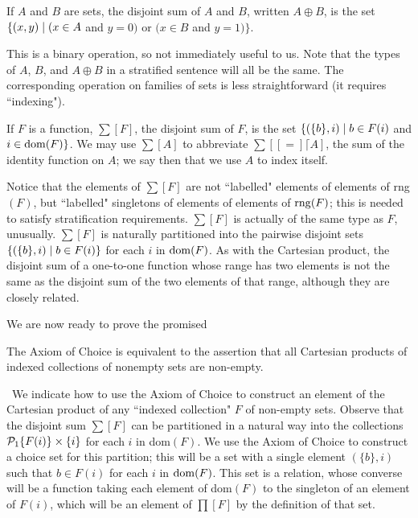 \begin{definition}
 If $A$ and $B$ are sets, the {\upshape disjoint sum} of $A$ and $B$, written $A \oplus B$, is the set $\{(x,y)
 \mid (x \in A$ and $y = 0)$ or $(x \in B$ and $y = 1)\}$.
\end{definition}

This is a binary operation, so not immediately useful to us.
Note that the types of $A$, $B$, and $A \oplus B$ in a
stratified sentence will all be the same.  The
corresponding operation on families of sets is less straightforward (it
requires ``indexing").

\begin{definition}
 If $F$ is a function, $\sum[F]$, the {\upshape disjoint
 sum\/} of $F$, is the 
 set $\{(\{b\},i) \mid b \in F(i)$ and $i \in \mathop{\mathrm{dom}}(F)\}$.  We may use
 $\sum[ A]$ to abbreviate $\sum[ [=] \lceil A]$, the sum of the
 identity function on $A$; we say then that we use $A$ to index itself.
\end{definition}

Notice that the elements of $\sum[ F]$ are not ``labelled" elements
of elements of rng$(F)$, but ``labelled" singletons of
elements of elements of $\mathop{\mathrm{rng}}(F)$; this is needed to satisfy
stratification requirements.  $\sum[ F]$ is actually of
the same type as $F$, unusually.
$\sum[ F]$ is naturally partitioned into the pairwise
disjoint sets $\{(\{b\},i)
\mid b \in F(i)\}$ for each $i$ in $\mathop{\mathrm{dom}}(F)$.  As with the
Cartesian product, the
disjoint sum of a one-to-one
function whose range has two elements is not the same as the
disjoint sum of the two elements of that range,
although they are closely related.

We are now ready to prove the promised

\begin{thm}
 The Axiom of Choice is equivalent to the assertion that all Cartesian products
 of indexed collections of nonempty sets are non-\linebreak empty.
\end{thm}

\preuve\ We indicate how to use the Axiom of Choice to construct an element of the Cartesian product of any ``indexed
collection" $F$ of non-empty sets.  Observe that the disjoint
sum $\sum[ F]$ can be partitioned in a
natural way into the collections ${\cal P}_1\{F(i)\} \times \{i\}$ for
each $i$ in dom$(F)$.  We use the Axiom of Choice to construct a
choice set for this partition; this will be a set with a single
element $(\{b\},i)$ such that $b \in F(i)$ for each $i$ in $\mathop{\mathrm{dom}}(F)$.
This set is a relation, whose converse will be a function taking each
element of dom$(F)$ to the singleton of an element of $F(i)$, which
will be an element of $\prod[F]$ by the definition of that set.

